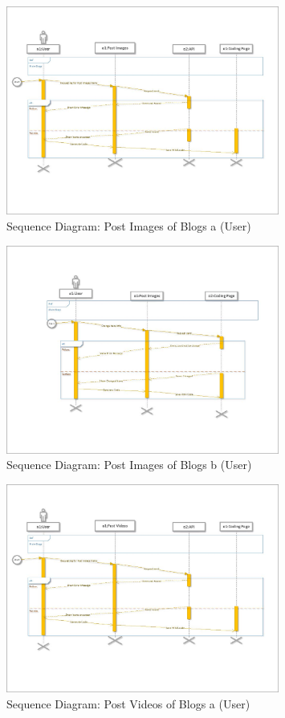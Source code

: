 \documentclass[12pt]{report}
\begin{document}
\begin{figure}[ht]
    \centering
    \includegraphics[width=0.8\textwidth]{Media/s1_Page_16.jpg} %
    \caption{Sequence Diagram: Post Images of Blogs a (User)}
    \label{fig:drawing1}
\end{figure}

\begin{figure}[ht]
    \centering
    \includegraphics[width=0.8\textwidth]{Media/s1_Page_17.jpg} %
    \caption{Sequence Diagram: Post Images of Blogs b (User)}
    \label{fig:drawing1}
\end{figure}

\begin{figure}[ht]
    \centering
    \includegraphics[width=0.8\textwidth]{Media/s1_Page_18.jpg} %
    \caption{Sequence Diagram: Post Videos of Blogs a (User)}
    \label{fig:drawing1}
\end{figure}
\end{document}
